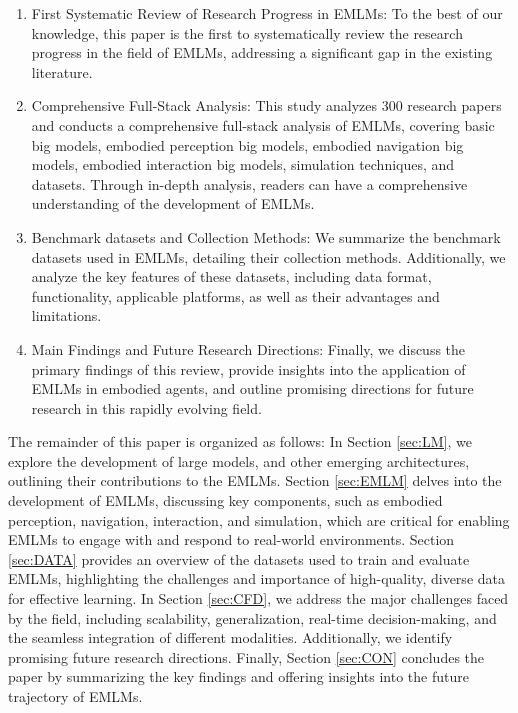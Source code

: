 \begin{enumerate}
    \item First Systematic Review of Research Progress in EMLMs: To the best of our knowledge, this paper is the first to systematically review the research progress in the field of EMLMs, addressing a significant gap in the existing literature.
    \item Comprehensive Full-Stack Analysis: This study analyzes 300 research papers and conducts a comprehensive full-stack analysis of EMLMs, covering basic big models, embodied perception big models, embodied navigation big models, embodied interaction big models, simulation techniques, and datasets. Through in-depth analysis, readers can have a comprehensive understanding of the development of EMLMs.
    \item Benchmark datasets and Collection Methods: We summarize the benchmark datasets used in EMLMs, detailing their collection methods. Additionally, we analyze the key features of these datasets, including data format, functionality, applicable platforms, as well as their advantages and limitations.
    \item Main Findings and Future Research Directions: Finally, we discuss the primary findings of this review, provide insights into the application of EMLMs in embodied agents, and outline promising directions for future research in this rapidly evolving field.
\end{enumerate}

The remainder of this paper is organized as follows: In Section \ref{sec:LM}, we explore the development of large models, and other emerging architectures, outlining their contributions to the EMLMs. Section \ref{sec:EMLM} delves into the development of EMLMs, discussing key components, such as embodied perception, navigation, interaction, and simulation, which are critical for enabling EMLMs to engage with and respond to real-world environments. Section \ref{sec:DATA} provides an overview of the datasets used to train and evaluate EMLMs, highlighting the challenges and importance of high-quality, diverse data for effective learning. In Section \ref{sec:CFD}, we address the major challenges faced by the field, including scalability, generalization, real-time decision-making, and the seamless integration of different modalities. Additionally, we identify promising future research directions. Finally, Section \ref{sec:CON} concludes the paper by summarizing the key findings and offering insights into the future trajectory of EMLMs.


